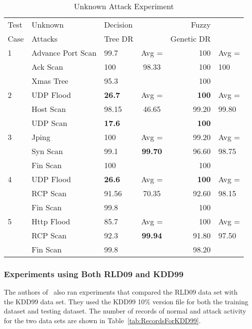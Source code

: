 \documentclass{sig-alternate}
\begin{document}
\begin{table}
\caption{Unknown Attack Experiment}
\begin{tabular}{|lllcrl|} \hline
Test & Unknown & Decision & & Fuzzy & \\
Case & Attacks & Tree DR & & Genetic DR & \\ \hline

1 & Advance Port Scan & 99.7 & Avg = & 100 & Avg =\\
  & Ack Scan          & 100  & 98.33 & 100 & 100\\
  & Xmas Tree         & 95.3 &       & 100 &\\ \hline

2 & UDP Flood & \textbf{26.7} & Avg = & \textbf{100} & Avg =\\
  & Host Scan & 98.15         & 46.65 & 99.20        & 99.80\\
  & UDP Scan  & \textbf{17.6} &       & \textbf{100} &\\ \hline

3 & Jping    & 100 & Avg =          & 99.20 & Avg =\\
  & Syn Scan & 99.1& \textbf{99.70} & 96.60 & 98.75\\
  & Fin Scan & 100 &                & 100 &\\ \hline

4 & UDP Flood & \textbf{26.6} & Avg = & \textbf{100} & Avg =\\
  & RCP Scan  & 91.56         & 70.35 & 92.60        & 98.15\\
  & Fin Scan  & 99.8          &       & 100          &\\ \hline

5 & Http Flood & 85.7& Avg =          & 100 & Avg =\\
  & RCP Scan  & 92.3 & \textbf{99.94} & 91.80 & 97.50\\
  & Fin Scan  & 99.8 &                & 98.20 &\\
  
\hline\end{tabular}
\label{tab:fuzGenExp2}
\end{table}



\subsubsection{Experiments using Both RLD09 and KDD99}
The authors of~\cite{6496342, 6559603} also ran experiments that compared the RLD09 data set with the KDD99 data set. They used the KDD99 10\% version file for both the training dataset and testing dataset. The number of records of normal and attack activity for the two data sets are shown in Table~\ref{tab:RecordsForKDD99}.
\end{document}
